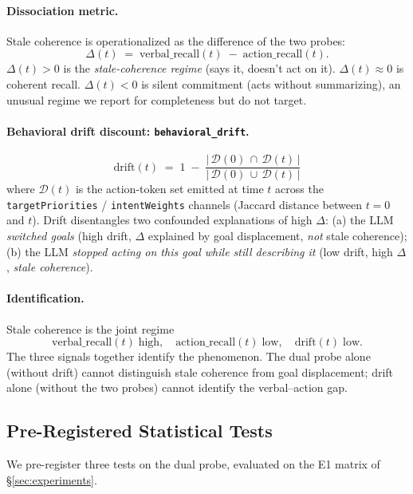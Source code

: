 \paragraph{Dissociation metric.} Stale coherence is operationalized
as the difference of the two probes:
$$
\Delta(t) \;=\; \text{verbal\_recall}(t) \;-\; \text{action\_recall}(t).
$$
$\Delta(t) > 0$ is the \emph{stale-coherence regime} (says it,
doesn't act on it). $\Delta(t) \approx 0$ is coherent recall.
$\Delta(t) < 0$ is silent commitment (acts without summarizing), an
unusual regime we report for completeness but do not target.

\paragraph{Behavioral drift discount: \texttt{behavioral\_drift}.}
$$
\text{drift}(t) \;=\; 1 \;-\;
\frac{|\,\mathcal{D}(0) \,\cap\, \mathcal{D}(t)\,|}
     {|\,\mathcal{D}(0) \,\cup\, \mathcal{D}(t)\,|}
$$
where $\mathcal{D}(t)$ is the action-token set emitted at time $t$
across the \texttt{targetPriorities} / \texttt{intentWeights}
channels (Jaccard distance between $t=0$ and $t$). Drift
disentangles two confounded explanations of high $\Delta$: (a) the
LLM \emph{switched goals} (high drift, $\Delta$ explained by goal
displacement, \emph{not} stale coherence); (b) the LLM
\emph{stopped acting on this goal while still describing it} (low
drift, high $\Delta$, \emph{stale coherence}).

\paragraph{Identification.} Stale coherence is the joint regime
\begin{equation}
\text{verbal\_recall}(t) \;\text{high},\quad
\text{action\_recall}(t) \;\text{low},\quad
\text{drift}(t) \;\text{low}.
\label{eq:stalecoh-id}
\end{equation}
The three signals together identify the phenomenon. The dual probe
alone (without drift) cannot distinguish stale coherence from goal
displacement; drift alone (without the two probes) cannot identify
the verbal--action gap.

\subsection{Pre-Registered Statistical Tests}
\label{sec:tests}

We pre-register three tests on the dual probe, evaluated on the E1
matrix of \S\ref{sec:experiments}.

